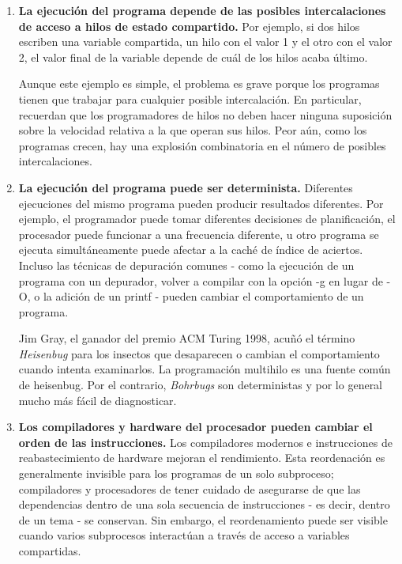 \documentclass[10pt]{book}
\begin{document}
\begin{enumerate}
\item \textbf{La ejecución del programa depende de las posibles intercalaciones de acceso a hilos de estado compartido.} Por ejemplo, si dos hilos escriben una variable compartida, un hilo con el valor 1 y el otro con el valor 2, el valor final de la variable depende de cuál de los hilos acaba último.

Aunque este ejemplo es simple, el problema es grave porque los programas tienen que trabajar para cualquier posible intercalación. En particular, recuerdan que los programadores de hilos no deben hacer ninguna suposición sobre la velocidad relativa a la que operan sus hilos. Peor aún, como los programas crecen, hay una explosión combinatoria en el número de posibles intercalaciones.

\item \textbf{La ejecución del programa puede ser determinista.} Diferentes ejecuciones del mismo programa pueden producir resultados diferentes. Por ejemplo, el programador puede tomar diferentes decisiones de planificación, el procesador puede funcionar a una frecuencia diferente, u otro programa se ejecuta simultáneamente puede afectar a la caché de índice de aciertos. Incluso las técnicas de depuración comunes - como la ejecución de un programa con un depurador, volver a compilar con la opción -g en lugar de -O, o la adición de un printf - pueden cambiar el comportamiento de un programa.

Jim Gray, el ganador del premio ACM Turing 1998, acuñó el término \textit{Heisenbug} para los insectos que desaparecen o cambian el comportamiento cuando intenta examinarlos. La programación multihilo es una fuente común de heisenbug. Por el contrario, \textit{Bohrbugs} son deterministas y por lo general mucho más fácil de diagnosticar.

\item \textbf{Los compiladores y hardware del procesador pueden cambiar el orden de las instrucciones.} Los compiladores modernos e instrucciones de reabastecimiento de hardware mejoran el rendimiento. Esta reordenación es generalmente invisible para los programas de un solo subproceso; compiladores y procesadores de tener cuidado de asegurarse de que las dependencias dentro de una sola secuencia de instrucciones - es decir, dentro de un tema - se conservan. Sin embargo, el reordenamiento puede ser visible cuando varios subprocesos interactúan a través de acceso a variables compartidas.
\end{enumerate}
\end{document}
